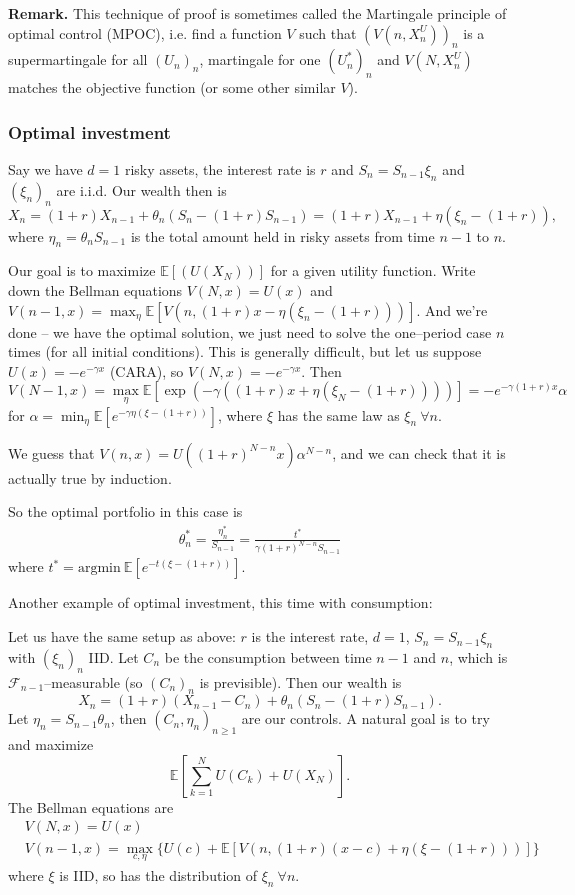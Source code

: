 \documentclass{article}
\theoremstyle{definition}
\begin{document}
\textbf{Remark.} This technique of proof is sometimes called the Martingale principle of optimal control (MPOC), i.e. find a function $V$ such that $(V(n,X_n^U))_n$ is a supermartingale for all $(U_n)_n$, martingale for one $(U^*_n)_n$ and $V(N,X_n^U)$ matches the objective function (or some other similar $V$).

\subsubsection*{Optimal investment}

Say we have $d=1$ risky assets, the interest rate is $r$ and $S_n=S_{n-1}\xi_n$ and $(\xi_n)_n$ are i.i.d. Our wealth then is \[
X_n= (1+r)X_{n-1}+\theta_n(S_n-(1+r)S_{n-1}) = (1+r)X_{n-1}+ \eta (\xi_n-(1+r)),
\]
where $\eta_n=\theta_n S_{n-1}$ is the total amount held in risky assets from time $n-1$ to $n$.

Our goal is to maximize $\mathbb{E}[(U(X_N))]$ for a given utility function. Write down the Bellman equations $V(N,x)=U(x)$ and $V(n-1,x) = \max_{\eta} \mathbb{E}[V(n,(1+r)x-\eta(\xi_n-(1+r)))]$. And we're done -- we have the optimal solution, we just need to solve the one--period case $n$ times (for all initial conditions). This is generally difficult, but let us suppose $U(x)=-e^{-\gamma x}$ (CARA), so $V(N,x)= -e^{-\gamma x}$. Then \[
V(N-1,x) = \max_{\eta} \mathbb{E}[\exp \left(-\gamma((1+r)x + \eta(\xi_N - (1+r)))\right)] = -e^{-\gamma(1+r)x}\alpha
\]
for $\alpha = \min_{\eta} \mathbb{E}[e^{-\gamma \eta(\xi-(1+r))}]$, where $\xi$ has the same law as $\xi_n ~\forall n$.

We guess that $V(n,x)=U((1+r)^{N-n}x)\alpha^{N-n}$, and we can check that it is actually true by induction.

So the optimal portfolio in this case is 
\begin{align*}
    \theta^*_n = \frac{\eta_n^*}{S_{n-1}} = \frac{t^*}{\gamma(1+r)^{N-n}S_{n-1}}
\end{align*}
where $t^* = \text{argmin}~\mathbb{E}[e^{-t(\xi-(1+r))}]$.
\vspace{1mm}

Another example of optimal investment, this time with consumption:

\vspace{1mm}

Let us have the same setup as above: $r$ is the interest rate, $d=1$, $S_n=S_{n-1}\xi_n$ with $(\xi_n)_n$ IID. Let $C_n$ be the consumption between time $n-1$ and $n$, which is $\mathcal{F}_{n-1}$--measurable (so $(C_n)_n$ is previsible). Then our wealth is \[
X_n = (1+r)(X_{n-1}-C_n) + \theta_n(S_n-(1+r)S_{n-1}).
\]
Let $\eta_n=S_{n-1}\theta_n$, then $(C_n,\eta_n)_{n\ge 1}$ are our controls. A natural goal is to try and maximize \[
    \mathbb{E}\left[\sum_{k=1}^{N} U(C_k)+U(X_N)\right].
\]
The Bellman equations are 
\begin{align*}
    &V(N,x)=U(x)\\
    &V(n-1,x) = \max_{c,\eta} \{U(c) + \mathbb{E}[V(n,(1+r)(x-c) + \eta(\xi-(1+r)))]\}
\end{align*}
where $\xi$ is IID, so has the distribution of $\xi_n ~\forall n$.
\end{document}
